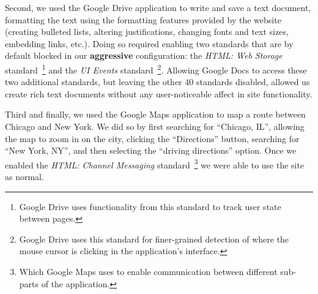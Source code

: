 Second, we used the Google Drive application to write and save a text
document, formatting the text using the formatting features provided by
the website (creating bulleted lists, altering justifications, changing
fonts and text sizes, embedding links, etc.).  Doing so required enabling
two standards that are by default blocked in our \textbf{aggressive} configuration:
the \textit{HTML: Web Storage} standard~\footnote{Google Drive uses functionality
from this standard to track user state between pages.} and the \textit{UI Events}
standard~\footnote{Google Drive uses this standard for finer-grained detection
of where the mouse cursor is clicking in the application's interface.}.
Allowing Google Docs to access these two additional standards, but leaving
the other 40 standards disabled, allowed us create rich text documents without
any user-noticeable affect in site functionality.

Third and finally, we used the Google Maps application to map a route between
Chicago and New York.  We did so by first searching for ``Chicago, IL'',
allowing the map to zoom in on the city, clicking the ``Directions'' button,
searching for ``New York, NY'', and then selecting the ``driving directions''
option.  Once we enabled the \textit{HTML: Channel Messaging}
standard~\footnote{Which Google Maps uses to enable communication between different
sub-parts of the application.} we were able to use the site as normal.
